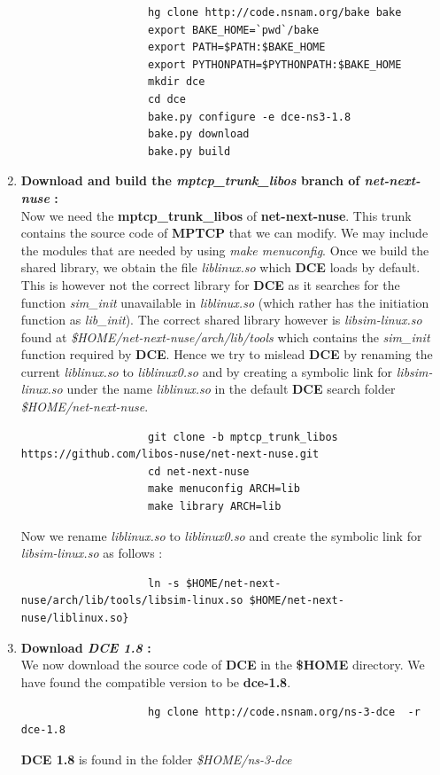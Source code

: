 \documentclass[a4paper,11pt]{article}
\begin{document}
\begin{enumerate}
				\begin{lstlisting}
					hg clone http://code.nsnam.org/bake bake
					export BAKE_HOME=`pwd`/bake
					export PATH=$PATH:$BAKE_HOME
					export PYTHONPATH=$PYTHONPATH:$BAKE_HOME
					mkdir dce
					cd dce
					bake.py configure -e dce-ns3-1.8
					bake.py download
					bake.py build
				\end{lstlisting}

			\item \textbf{Download and build the \emph{mptcp\_trunk\_libos} branch of \emph{net-next-nuse} :} \\Now we need the \textbf{mptcp\_trunk\_libos} of \textbf{net-next-nuse}. This trunk contains the source code of \textbf{MPTCP} that we can modify. We may include the modules that are needed by using \emph{make menuconfig}. Once we build the shared library, we obtain the file \emph{liblinux.so} which \textbf{DCE} loads by default. This is however not the correct library for \textbf{DCE} as it searches for the function \emph{sim\_init} unavailable in \emph{liblinux.so} (which rather has the initiation function as \emph{lib\_init}). The correct shared library however is \emph{libsim-linux.so} found at \emph{\$HOME/net-next-nuse/arch/lib/tools} which contains the \emph{sim\_init} function required by \textbf{DCE}. Hence we try to mislead \textbf{DCE} by renaming the current \emph{liblinux.so} to \emph{liblinux0.so} and by creating a symbolic link for \emph{libsim-linux.so} under the name \emph{liblinux.so} in the default \textbf{DCE} search folder \emph{\$HOME/net-next-nuse}.
				\begin{lstlisting}
					git clone -b mptcp_trunk_libos https://github.com/libos-nuse/net-next-nuse.git
					cd net-next-nuse
					make menuconfig ARCH=lib
					make library ARCH=lib
				\end{lstlisting}
				Now we rename \emph{liblinux.so} to \emph{liblinux0.so} and create the symbolic link for \emph{libsim-linux.so} as follows :
				\begin{lstlisting}
					ln -s $HOME/net-next-nuse/arch/lib/tools/libsim-linux.so $HOME/net-next-nuse/liblinux.so}
				\end{lstlisting}

			\item \textbf{Download \emph{DCE 1.8} :} \\We now download the source code of \textbf{DCE} in the \textbf{\$HOME} directory. We have found the compatible version to be \textbf{dce-1.8}.
				\begin{lstlisting}
					hg clone http://code.nsnam.org/ns-3-dce  -r dce-1.8
				\end{lstlisting}
				\textbf{DCE 1.8} is found in the folder \emph{\$HOME/ns-3-dce}



\end{enumerate}
\end{document}
